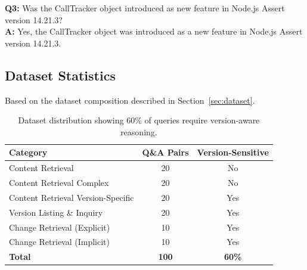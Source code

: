 \textbf{Q3:} Was the CallTracker object introduced as new feature in Node.js Assert version 14.21.3?\\
\textbf{A:} Yes, the CallTracker object was introduced as a new feature in Node.js Assert version 14.21.3.

\subsection{Dataset Statistics}

Based on the dataset composition described in Section~\ref{sec:dataset}.

\begin{table}[hb]
\centering
\small
\caption{Dataset distribution showing 60\% of queries require version-aware reasoning.}
\begin{tabular}{lcc}
\hline
\textbf{Category} & \textbf{Q\&A Pairs} & \textbf{Version-Sensitive} \\ \hline
Content Retrieval & 20 & No \\
Content Retrieval Complex & 20 & No \\
Content Retrieval Version-Specific & 20 & Yes \\
Version Listing \& Inquiry & 20 & Yes \\
Change Retrieval (Explicit) & 10 & Yes \\
Change Retrieval (Implicit) & 10 & Yes \\ \hline
\textbf{Total} & \textbf{100} & \textbf{60\%} \\ \hline
\end{tabular}
\label{tab:dataset_statistics}
\end{table}

